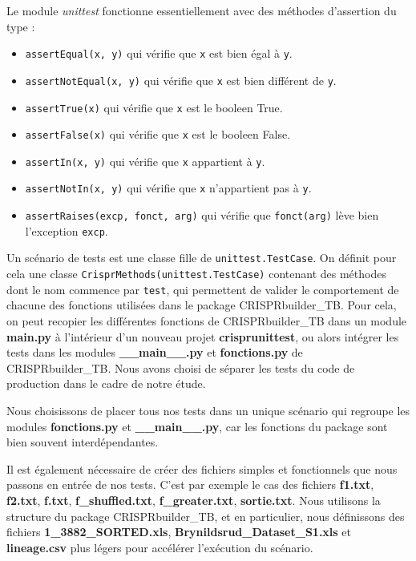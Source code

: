 \documentclass[twoside,a4paper,11pt,frenchb,openany]{report}
\begin{document}
Le module \textit{unittest} fonctionne essentiellement avec des méthodes d'assertion du type :

\begin{itemize}
\item \texttt{assertEqual(x, y)} qui vérifie que \texttt{x} est bien égal à \texttt{y}. 
\item \texttt{assertNotEqual(x, y)} qui vérifie que \texttt{x} est bien différent de \texttt{y}.
\item \texttt{assertTrue(x)} qui vérifie que \texttt{x} est le booleen True.
\item \texttt{assertFalse(x)} qui vérifie que \texttt{x} est le booleen False.
\item \texttt{assertIn(x, y)} qui vérifie que \texttt{x} appartient à \texttt{y}.
\item \texttt{assertNotIn(x, y)} qui vérifie que \texttt{x} n'appartient pas à \texttt{y}.
\item \texttt{assertRaises(excp, fonct, arg)} qui vérifie que \texttt{fonct(arg)} lève bien l'exception \texttt{excp}.
\end{itemize}

Un scénario de tests est une classe fille de \texttt{unittest.TestCase}. On définit pour cela une classe \texttt{CrisprMethods(unittest.TestCase)} contenant des méthodes dont le nom commence par \texttt{test}, qui permettent de valider le comportement de chacune des fonctions utilisées dans le package CRISPRbuilder\_TB. Pour cela, on peut recopier les différentes fonctions de CRISPRbuilder\_TB dans un module \textbf{main.py} à l'intérieur d'un nouveau projet \textbf{crisprunittest}, ou alors intégrer les tests dans les modules \textbf{\_\_main\_\_.py} et \textbf{fonctions.py} de CRISPRbuilder\_TB. Nous avons choisi de séparer les tests du code de production dans le cadre de notre étude. 

Nous choisissons de placer tous nos tests dans un unique scénario qui regroupe les modules  \textbf{fonctions.py} et \textbf{\_\_main\_\_.py}, car les fonctions du package sont bien souvent interdépendantes.

Il est également nécessaire de créer des fichiers simples et fonctionnels que nous passons en entrée de nos tests. C'est par exemple le cas des fichiers \textbf{f1.txt}, \textbf{f2.txt}, \textbf{f.txt}, \textbf{f\_shuffled.txt}, \textbf{f\_greater.txt}, \textbf{sortie.txt}. Nous utilisons la structure du package CRISPRbuilder\_TB, et en particulier, nous définissons des fichiers \textbf{1\_3882\_SORTED.xls}, \textbf{Brynildsrud\_Dataset\_S1.xls} et \textbf{lineage.csv} plus légers pour accélérer l'exécution du scénario.
\end{document}
